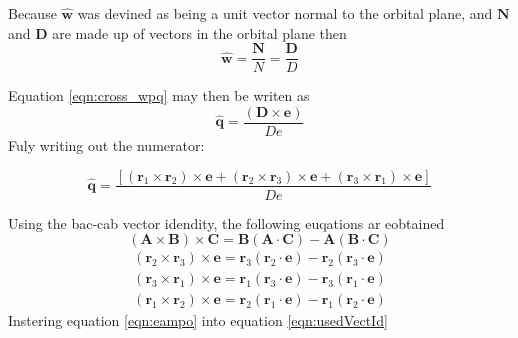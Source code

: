 \documentclass[12pt]{article}
\begin{document}
	Because $\hat{ \mathbf { w } }$ was devined as being a unit vector normal to the orbital plane, and $\mathbf{ N }$ and $\mathbf{ D }$ are made up of vectors in the orbital plane then
	\begin{equation}
	\hat{ \mathbf { w } }=\frac{\mathbf{ N }}{N}=\frac{\mathbf{ D }}{D}
	\end{equation}
	
	Equation \ref{eqn:cross_wpq} may then be writen as
	\begin{equation}
	\hat { \mathbf { q } } = \frac { ( \mathbf { D } \times \mathbf { e } ) } { D e }
	\label{eqn:p1}
	\end{equation}
	Fuly writing out the numerator:
	
	\begin{equation}
	\hat { \mathbf { q } } = \frac { \left[ \left( \mathbf { r } _ { 1 } \times \mathbf { r } _ { 2 } \right) \times \mathbf { e } + \left( \mathbf { r } _ { 2 } \times \mathbf { r } _ { 3 } \right) \times \mathbf { e } + \left( \mathbf { r } _ { 3 } \times \mathbf { r } _ { 1 } \right) \times \mathbf { e } \right] } { D e } 
	\end{equation}
	
	Using the bac-cab vector idendity, the following euqations ar eobtained
	\begin{equation}
	( \mathbf { A } \times \mathbf { B } ) \times \mathbf { C }  = \mathbf { B } ( \mathbf { A } \cdot \mathbf { C } ) - \mathbf { A } ( \mathbf { B } \cdot \mathbf { C } )
	\end{equation}
	\begin{eqnarray}
	{ \left( \mathbf { r } _ { 2 } \times \mathbf { r } _ { 3 } \right) \times \mathbf { e } = \mathbf { r } _ { 3 } \left( \mathbf { r } _ { 2 } \cdot \mathbf { e } \right) - \mathbf { r } _ { 2 } \left( \mathbf { r } _ { 3 } \cdot \mathbf { e } \right) } \\ { \left( \mathbf { r } _ { 3 } \times \mathbf { r } _ { 1 } \right) \times \mathbf { e } = \mathbf { r } _ { 1 } \left( \mathbf { r } _ { 3 } \cdot \mathbf { e } \right) - \mathbf { r } _ { 3 } \left( \mathbf { r } _ { 1 } \cdot \mathbf { e } \right) } \\ { \left( \mathbf { r } _ { 1 } \times \mathbf { r } _ { 2 } \right) \times \mathbf { e } = \mathbf { r } _ { 2 } \left( \mathbf { r } _ { 1 } \cdot \mathbf { e } \right) - \mathbf { r } _ { 1 } \left( \mathbf { r } _ { 2 } \cdot \mathbf { e } \right) } 
	\label{eqn:usedVectId}
	\end{eqnarray}
	Instering equation \ref{eqn:eampo} into equation \ref{eqn:usedVectId}  
	
\end{document}
